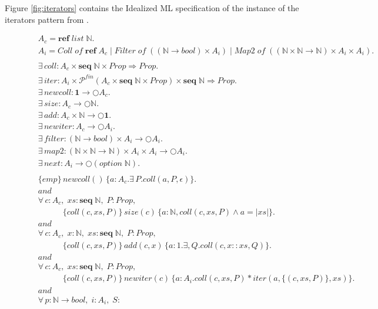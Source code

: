 \documentclass[a4paper,english]{article}
\newcommand{\N}[0]{\mathbb{N}}
\newcommand{\PROP}[0]{Prop}
\newcommand{\LIST}[0]{list}
\newcommand{\SEQ}[0]{\mathbf{seq}}
\newcommand{\MONAD}[0]{\bigcirc}
\newcommand{\AND}[0]{and}
\newcommand{\REF}[0]{\mathbf{ref}}
\newcommand{\OPTION}[0]{option}
\newcommand{\EMP}[0]{emp}
\newcommand{\PFIN}[0]{\mathcal{P}^{fin}}
\begin{document}
Figure \ref{fig:iterators} contains the Idealized ML specification of the
instance of the iterators pattern from \cite{patterns}. 
\begin{figure}[p]
\begin{align*}
& A_c = \REF\;\LIST\;\N.\\
& A_i = Coll\; of\; \REF\;A_c\; |\; Filter\;of\;((\N\rightarrow bool) \times
A_i)\; |\; Map2\;of\;((\N \times \N \rightarrow \N) \times A_i \times A_i).\\
& \\
& \exists\, coll : A_c \times \SEQ\; \N \times \PROP \Rightarrow \PROP.\\
& \exists\, iter : A_i \times \PFIN(A_c \times \SEQ\;\N\times
\PROP)\times \SEQ\;\N \Rightarrow \PROP.\\
& \exists\, newcoll : \mathbf{1} \rightarrow \MONAD A_c.\\
& \exists\, size : A_c \rightarrow \MONAD \N.\\
& \exists\, add : A_c \times \N \rightarrow \MONAD \mathbf{1}.\\
& \exists\, newiter : A_c \rightarrow \MONAD A_i.\\
& \exists\, filter : (\N \rightarrow bool) \times A_i \rightarrow
\MONAD A_i.\\
& \exists\, map2 : (\N \times \N \rightarrow \N)
\times A_i \times A_i \rightarrow \MONAD A_i.\\
& \exists\, next : A_i \rightarrow \MONAD (\OPTION\; \N).\\
& \\
& \{\EMP\}\,newcoll()\,\{a : A_c.\exists\,P. coll(a,P,\epsilon)\}.\\
& \AND\\
& \forall\,c : A_c,\; xs : \SEQ\;\N,\; P : \PROP,\\
&\quad\quad\quad \{coll(c,xs,P)\}\,size(c)\,\{a :
\N, coll(c,xs,P) \wedge a = |xs|\}.\\
& \AND\\
& \forall\,c : A_c,\; x : \N,\; xs : \SEQ\;\N,\; P : \PROP,\\
&\quad\quad\quad \{coll(c,xs,P)\}\,add(c,x)\,\{a : 1. \exists, Q.
coll(c,x::xs,Q)\}.\\
& \AND\\
& \forall\,c : A_c,\; xs : \SEQ\;\N,\; P : \PROP,\\
&\quad\quad\quad \{coll(c,xs,P)\}\,newiter(c)\,\{a : A_i. coll(c,xs,P) *
iter (a, \{(c,xs,P)\},xs)\}.\\
& \AND\\
& \forall\,p : \N \rightarrow bool,\; i : A_i,\; S :

\end{align*}
\end{figure}
\end{document}
